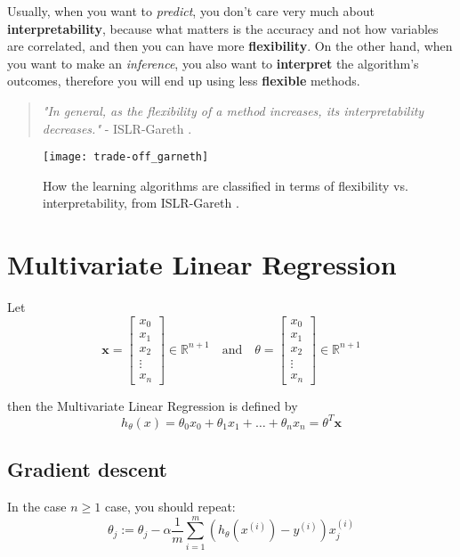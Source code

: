 \documentclass[a4paper,11pt]{article}
\begin{document}
  Usually, when you want to \textit{predict}, you don't care very much about \textbf{interpretability}, because what matters is the accuracy and not how variables are correlated, and then you can have more \textbf{flexibility}. On the other hand, when you want to make an \textit{inference}, you also want to \textbf{interpret} the algorithm's outcomes, therefore you will end up using less \textbf{flexible} methods.

  \begin{quotation}
    \textit{"In general, as the flexibility of a method increases, its interpretability decreases."} - ISLR-Gareth \cite{gareth}.
  \end{quotation}

\begin{figure}[h]
  \texttt{[image: trade-off\_garneth]}
  \caption{How the learning algorithms are classified in terms of flexibility vs. interpretability, from ISLR-Gareth \cite{gareth}.}
  \label{}
\end{figure}

\section{Multivariate Linear Regression}

Let
\begin{equation}
  \mathbf{x}=
  \begin{bmatrix}
    x_0 \\ x_1 \\ x_2 \\ \vdots \\ x_n
  \end{bmatrix} \in \mathbb{R}^{n+1}
  \quad \text{and} \quad
  \theta=
  \begin{bmatrix}
    x_0 \\ x_1 \\ x_2 \\ \vdots \\ x_n
  \end{bmatrix} \in \mathbb{R}^{n+1}
\end{equation}

then the Multivariate Linear Regression is defined by
\begin{equation}
  h_\theta(x)=\theta_0 x_0 + \theta_1 x_1 + \dots + \theta_n x_n = \theta^T \mathbf{x}
\end{equation}

\subsection*{Gradient descent}
In the case $n\geq 1$ case, you should repeat:
\begin{equation}
  \theta_j := \theta_j - \alpha\frac{1}{m}\sum_{i=1}^m (h_\theta (x^{(i)})-y^{(i)})x_{j}^{(i)}
\end{equation}
\end{document}
